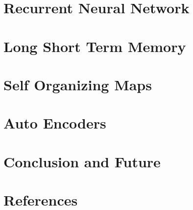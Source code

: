 
\section[RNN]{Recurrent Neural Network}



\section[LSTM]{Long Short Term Memory}



\section[SOM]{Self Organizing Maps}
 
\section[AutoEncoder]{Auto Encoders} 


\section[End]{Conclusion and Future}


\section[Refs]{References}
